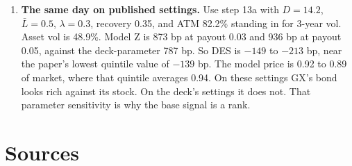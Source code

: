 \documentclass[10pt,a4paper]{article}
\newcommand{\Lbar}{\bar{L}}
\begin{document}
\begin{enumerate}[leftmargin=*,itemsep=2pt]
\item \textbf{The same day on published settings.} Use step 13a with $D=14.2$, $\Lbar=0.5$, $\lambda=0.3$, recovery 0.35, and ATM 82.2\% standing in for 3-year vol. Asset vol is 48.9\%. Model Z is 873 bp at payout 0.03 and 936 bp at payout 0.05, against the deck-parameter 787 bp. So DES is $-149$ to $-213$ bp, near the paper's lowest quintile value of $-139$ bp. The model price is 0.92 to 0.89 of market, where that quintile averages 0.94. On these settings GX's bond looks rich against its stock. On the deck's settings it does not. That parameter sensitivity is why the base signal is a rank.
\end{enumerate}

\section{Sources}\label{app:sources}
\end{document}
